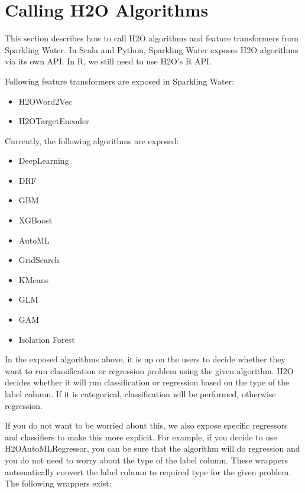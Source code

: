 \documentclass{standalone}
\begin{document}
	\section{Calling H2O Algorithms}

	This section describes how to call H2O algorithms and feature transformers from Sparkling Water. In Scala and Python, Sparkling Water
	exposes H2O algorithms via its own API. In R, we still need to use H2O's R API.

	Following feature transformers are exposed in Sparkling Water:

	\begin{itemize}
		\item H2OWord2Vec
		\item H2OTargetEncoder
	\end{itemize}

	Currently, the following algorithms are exposed:

	\begin{itemize}
		\item DeepLearning
		\item DRF
		\item GBM
		\item XGBoost
		\item AutoML
		\item GridSearch
		\item KMeans
		\item GLM
		\item GAM
		\item Isolation Forest
	\end{itemize}

	In the exposed algorithms above, it is up on the users to decide whether they want to run classification or
	regression problem using the given algorithm. H2O decides whether it will run classification or regression based
	on the type of the label column. If it is categorical, classification will be performed, otherwise regression.

	If you do not want to be worried about this, we also expose specific regressors and classifiers to make this more
	explicit. For example, if you decide to use H2OAutoMLRegressor, you can be sure that the algorithm will do regression
	and you do not need to worry about the type of the label column. These wrappers automatically convert the label
	column to required type for the given problem. The following wrappers exist:
\end{document}
